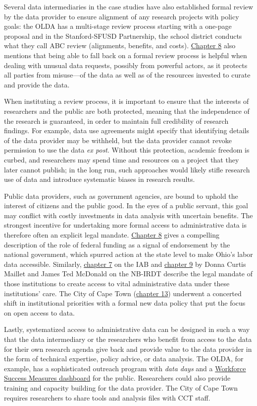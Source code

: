 Several data intermediaries in the case studies have also established formal review by the data provider to ensure alignment of any research projects with policy goals: the OLDA has a multi-stage review process starting with a one-page proposal and in the Stanford-SFUSD Partnership, the school district conducts what they call ABC review (alignments, benefits, and costs). \protect\hyperlink{olda}{Chapter 8} also mentions that being able to fall back on a formal review process is helpful when dealing with unusual data requests, possibly from powerful actors, as it protects all parties from misuse---of the data as well as of the resources invested to curate and provide the data.

When instituting a review process, it is important to ensure that the interests of researchers and the public are both protected, meaning that the independence of the research is guaranteed, in order to maintain full credibility of research findings. For example, data use agreements might specify that identifying details of the data provider may be withheld, but the data provider cannot revoke permission to use the data \emph{ex post}. Without this protection, academic freedom is curbed, and researchers may spend time and resources on a project that they later cannot publish; in the long run, such approaches would likely stifle research use of data and introduce systematic biases in research results.

Public data providers, such as government agencies, are bound to uphold the interest of citizens and the public good. In the eyes of a public servant, this goal may conflict with costly investments in data analysis with uncertain benefits. The strongest incentive for undertaking more formal access to administrative data is therefore often an explicit legal mandate. \protect\hyperlink{olda}{Chapter 8} gives a compelling description of the role of federal funding as a signal of endorsement by the national government, which spurred action at the state level to make Ohio's labor data accessible. Similarly, \protect\hyperlink{iab}{chapter 7} on the IAB and \protect\hyperlink{nb-irdt}{chapter 9} by Donna Curtis Maillet and James Ted McDonald on the NB-IRDT describe the legal mandate of those institutions to create access to vital administrative data under these institutions' care. The City of Cape Town (\protect\hyperlink{cct}{chapter 13}) underwent a concerted shift in institutional priorities with a formal new data policy that put the focus on open access to data.

Lastly, systematized access to administrative data can be designed in such a way that the data intermediary or the researchers who benefit from access to the data for their own research agenda give back and provide value to the data provider in the form of technical expertise, policy advice, or data analysis. The OLDA, for example, has a sophisticated outreach program with \emph{data days} and a \href{https://workforcesuccess.chrr.ohio-state.edu/home}{Workforce Success Measures dashboard} for the public. Researchers could also provide training and capacity building for the data provider. The City of Cape Town requires researchers to share tools and analysis files with CCT staff.

